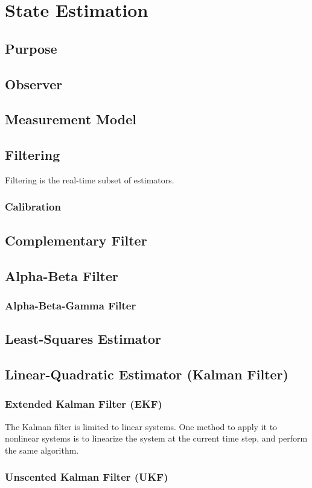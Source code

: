 \documentclass[../notes.tex]{subfiles}
\begin{document}
\section{State Estimation}
\subsection{Purpose}
\subsection{Observer}
\subsection{Measurement Model}
\subsection{Filtering}
Filtering is the real-time subset of estimators.
\subsubsection{Calibration}
\subsection{Complementary Filter}
\subsection{Alpha-Beta Filter}
\subsubsection{Alpha-Beta-Gamma Filter}
\subsection{Least-Squares Estimator}
\subsection{Linear-Quadratic Estimator (Kalman Filter)}
\subsubsection{Extended Kalman Filter (EKF)}
The Kalman filter is limited to linear systems. One method to apply it to nonlinear systems is to linearize the system at the current time step, and perform the same algorithm.
\subsubsection{Unscented Kalman Filter (UKF)}
\end{document}

